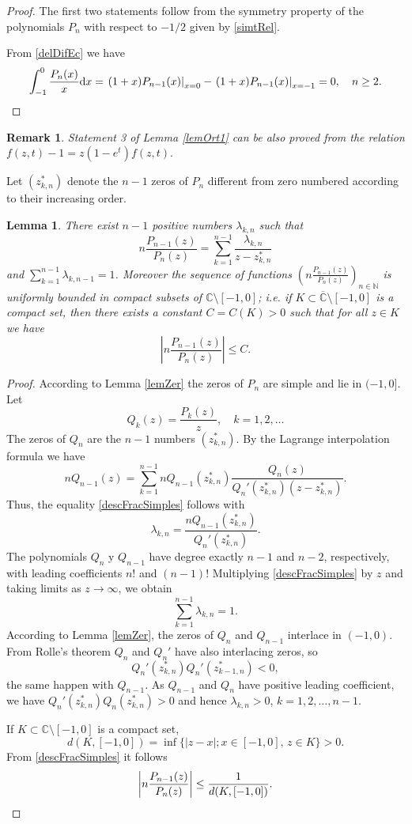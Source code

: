 \documentclass[11pt]{article}
\newtheorem{lemma}{Lemma}
\newtheorem{rem}{Remark}
\newcommand{\dd}{\mathrm{d}}
\begin{document}
\begin{proof} The first two statements follow from the symmetry property of the polynomials $P_n$ with respect to $-1/2$ given by \eqref{simtRel}.

From \eqref{delDifEc} we have
\[
\int_{-1}^0\frac{P_n(x)}{x}\dd x=\left.(1+x)P_{n-1}(x)\right|_{x=0}-\left.(1+x)P_{n-1}(x)\right|_{x=-1}=0,\quad n\ge 2.\qedhere
\]
\end{proof}

\begin{rem} Statement 3 of Lemma \ref{lemOrt1} can be also proved from the relation
$f(z,t)-1=z(1-e^t)f(z,t).$
\end{rem}

Let $(z_{k,n}^*)$ denote the $n-1$ zeros of $P_n$ different from zero numbered according to their increasing order.

\begin{lemma}\label{LemCocienteCons} There exist $n-1$ positive numbers $\lambda_{k,n}$ such that 
\begin{equation}
\label{descFracSimples}
n\frac{P_{n-1}(z)}{P_n(z)}=\sum_{k=1}^{n-1}\frac{\lambda_{k,n}}{z-z_{k,n}^*}
\end{equation}
and $\sum_{k=1}^{n-1}\lambda_{k,n-1}=1$. Moreover the sequence of functions $\left(n\frac{P_{n-1}(z)}{P_n(z)}\right)_{n\in\mathbb{N}}$ is uniformly bounded in compact subsets of  $\mathbb{C}\setminus[-1,0]$; i.e. if $K\subset \overline{\mathbb{C}}\setminus[-1,0]$ is a compact set, then there exists a constant $C=C(K)>0$ such that for all  $z\in K$ we have
\[
\left|n\frac{P_{n-1}(z)}{P_n(z)}\right|\le C.
\]

\end{lemma}

\begin{proof} According to  Lemma \ref{lemZer} the zeros of $P_n$ are simple and lie in $(-1,0]$. Let
\[
Q_k(z)=\frac{P_k(z)}{z},\quad k=1,2,\ldots
\]
The zeros of $Q_n$ are the $n-1$ numbers $(z_{k,n}^*)$. By the Lagrange  interpolation formula we have
\[
nQ_{n-1}(z)=\sum_{k=1}^{n-1}nQ_{n-1}(z_{k,n}^*)\frac{Q_n(z)}{Q_n'(z_{k,n}^*)(z-z_{k,n}^*)}.
\]
Thus, the equality \eqref{descFracSimples} follows with
\[
\lambda_{k,n}=\frac{nQ_{n-1}(z_{k,n}^*)}{Q_n'(z_{k,n}^*)}.
\]
The polynomials $Q_n$ y $Q_{n-1}$ have degree exactly $n-1$ and $n-2$, respectively, with leading coefficients $n!$ and $(n-1)!$ Multiplying  \eqref{descFracSimples} by $z$ and taking limits as $z\to\infty$, we obtain
\[
\sum_{k=1}^{n-1}\lambda_{k,n}=1.
\]
According to  Lemma \ref{lemZer}, the zeros of $Q_n$ and $Q_{n-1}$  interlace in $(-1,0)$. From Rolle's theorem $Q_n$ and $Q_n'$ have also interlacing zeros, so 
\[
Q_n'(z_{k,n}^*)Q_n'(z_{k-1,n}^*)<0,
\]
the same happen with $Q_{n-1}$. As $Q_{n-1}$ and $Q_{n}$ have positive leading coefficient, we have
$Q_n'(z_{k,n}^*)Q_n(z_{k,n}^*)>0$ and hence $\lambda_{k,n}>0$, $k=1,2,\ldots,n-1.$

If $K\subset \mathbb{C}\setminus [-1,0]$ is a compact set, 
\[
d(K,[-1,0])=\inf\{|z-x|; x\in[-1,0],\, z\in K\}>0.
\]
From \eqref{descFracSimples} it follows
\[
\left|n\frac{P_{n-1}(z)}{P_n(z)}\right|\le \frac{1}{d(K,[-1,0])}.\qedhere
\]


\end{proof}
\end{document}
